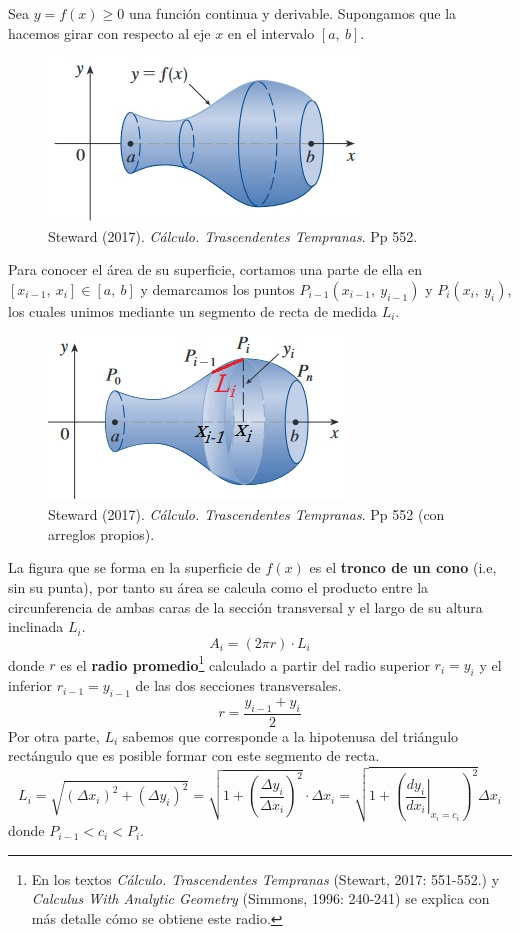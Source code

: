 \documentclass[12pt]{article}
\begin{document}
Sea $y = f(x) \geq 0$ una función continua y derivable. Supongamos que la hacemos girar con respecto al eje $x$ en el intervalo $[a, \ b]$.

\begin{figure}[hbt!]
\centering
\includegraphics[scale=0.7]{surface-area-1.jpg}
\caption{Steward (2017). \textit{Cálculo. Trascendentes Tempranas}. Pp 552.}
\end{figure}

Para conocer el área de su superficie, cortamos una parte de ella en $[x_{i - 1}, \ x_{i}] \in [a, \ b]$ y demarcamos los puntos $P_{i - 1}(x_{i - 1}, \ y_{i - 1})$ y $P_{i}(x_{i}, \ y_{i})$, los cuales unimos mediante un segmento de recta de medida $L_{i}$.

\newpage

\begin{figure}[hbt!]
\centering
\includegraphics[scale=0.7]{surface-area-2.jpg}
\caption{Steward (2017). \textit{Cálculo. Trascendentes Tempranas}. Pp 552 (con arreglos propios).}
\end{figure}

La figura que se forma en la superficie de $f(x)$ es el \textbf{tronco de un cono} (i.e, sin su punta), por tanto su área se calcula como el producto entre la circunferencia de ambas caras de la sección transversal y el largo de su altura inclinada $L_{i}$.
\[
  A_{i} = (2 \pi r) \cdot L_{i}
\]
donde $r$ es el \textbf{radio promedio}\footnote{En los textos \textit{Cálculo. Trascendentes Tempranas} (Stewart, 2017: 551-552.) y \textit{Calculus With Analytic Geometry} (Simmons, 1996: 240-241) se explica con más detalle cómo se obtiene este radio.} calculado a partir del radio superior $r_{i} = y_{i}$ y el inferior $r_{i - 1} = y_{i - 1}$ de las dos secciones transversales.
\[
  r = \frac{y_{i - 1} + y_{i}}{2}
\]
Por otra parte, $L_{i}$ sabemos que corresponde a la hipotenusa del triángulo rectángulo que es posible formar con este segmento de recta.
\[
  L_{i} = \sqrt{(\Delta x_{i})^{2} + (\Delta y_{i})^{2}}
        = \sqrt{1 + \left(\frac{\Delta y_{i}}{\Delta x_{i}}\right)^{2}} \cdot \Delta x_{i}
        = \sqrt{1 + \left(\left. \frac{dy_{i}}{dx_{i}} \right|_{x_{i} = c_{i}}\right)^{2}} \Delta x_{i}
\]
donde $P_{i - 1} < c_{i} < P_{i}$.
\end{document}

